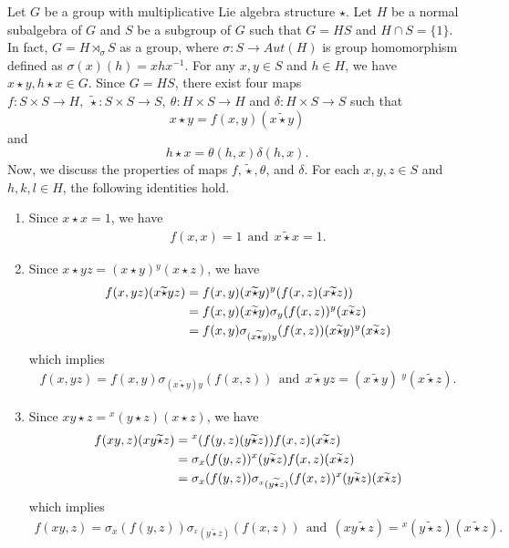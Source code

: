 \documentclass[10 pt,oneside,reqno,a4paper]{amsart}
\numberwithin{equation}{section}
\begin{document}
Let $G$ be a group with multiplicative Lie algebra structure $\star$. Let $H$ be a normal subalgebra of $G$ and $S$ be a subgroup of $G$ such that $G = HS$ and $H\cap S = \{1\}.$ In fact, $G = H \rtimes_{\sigma} S$ as a group, where $\sigma: S \to Aut(H)$ is  group homomorphism defined as $\sigma(x)(h) = xhx^{-1}$.  For any $x,y \in S$ and $h\in H$, we have $x \star y, h \star x \in G$. Since $G = HS$, there exist four maps $f: S \times S \to H,~ \widetilde{\star}: S \times S \to S, ~\theta:H \times S \to H$ and $\delta:H \times S \to S$ such that
\[x \star y=f(x,y) (x\widetilde{\star} y)\] and \[ h \star x=\theta(h,x)\delta(h,x).\] 
Now, we discuss the properties of maps $f, \widetilde{\star}, \theta$, and $\delta$. For each $x,y,z \in S$ and $h,k,l \in H$, the following identities hold.
\begin{enumerate}
     \item Since $x\star x=1$, we have 
    \begin{align}
        f(x,x)=1 ~~\text{and}~~ x\widetilde{\star} x=1. 
    \end{align}
    
\item Since $ x\star yz =(x\star y) {^y(x\star z)}$, we have
\begin{align}
    f(x,yz) (x\widetilde{\star} yz) &= f(x,y) (x\widetilde{\star} y) {^y(f(x,z) (x\widetilde{\star} z))} \notag
    \\&= f(x,y) (x\widetilde{\star} y) \sigma_y(f(x,z)){^y (x\widetilde{\star} z)} \notag
    \\&=f(x,y) \sigma_{(x\widetilde{\star} y)y}(f(x,z))(x\widetilde{\star} y){^y(x\widetilde{\star} z)} \notag
\end{align} 
 which implies 
 \begin{align}
      f(x,yz)= f(x,y) \sigma_{(x\widetilde{\star} y)y}(f(x,z)) ~~\text{and}~~ x\widetilde{\star} yz= (x\widetilde{\star} y)~{^y(x\widetilde{\star} z)}.
 \end{align}


\item Since $xy \star z={^x(y \star z)} (x \star z)$, we have 
\begin{align*}
    f(xy,z) (xy\widetilde{\star} z)&= {^x(f(y,z)(y\widetilde{\star} z))} f(x,z)(x\widetilde{\star} z)\notag
    \\&=\sigma_x(f(y,z)){^x(y\widetilde{\star} z)} f(x,z)(x\widetilde{\star} z) \notag
    \\&=\sigma_x(f(y,z)) \sigma_{^x(y\widetilde{\star} z)}(f(x,z)){^x(y\widetilde{\star} z)}(x\widetilde{\star} z)
\end{align*}
    which implies 
    \begin{align}
        f(xy,z)=\sigma_x(f(y,z)) \sigma_{^x(y\widetilde{\star} z)}(f(x,z)) ~~\text{and}~~ (xy\widetilde{\star} z)={^x(y\widetilde{\star} z)}(x\widetilde{\star} z).
    \end{align}
    

\end{enumerate}
\end{document}
